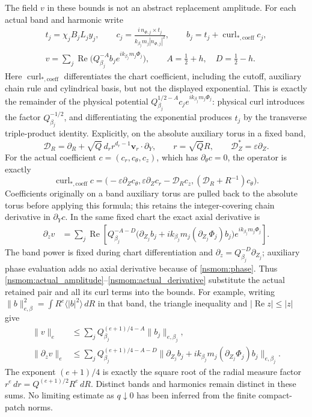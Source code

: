 The field $v$ in these bounds is not an abstract replacement amplitude.
For each actual band and harmonic write
\begin{gather}
 t_j=\chi_jB_jL_jy_j,\qquad
 c_j=\frac{i\,n_{\Phi,j}\times t_j}
                  {k_{\beta_j}m_j|n_{\Phi,j}|^2},\qquad
 b_j=t_j+\operatorname{curl}_{*,\mathrm{coeff}}c_j,\nonumber\\
 v=\sum_j\operatorname{Re}
       \bigl(Q_{\beta_j}^{-A}b_j e^{ik_{\beta_j}m_j\Phi_j}\bigr),
 \qquad A=\tfrac12+h,\quad D=\tfrac12-h.
 \label{nsmom:actual_amplitude}
\end{gather}
Here $\operatorname{curl}_{*,\mathrm{coeff}}$ differentiates the chart
coefficient, including the cutoff, auxiliary chain rule and cylindrical
basis, but not the displayed exponential. This is exactly the
remainder of the physical potential
$Q_{\beta_j}^{1/2-A}c_j e^{ik_{\beta_j}m_j\Phi_j}$: physical curl
introduces the factor $Q_{\beta_j}^{-1/2}$, and differentiating the
exponential produces $t_j$ by the transverse triple-product identity.
Explicitly, on the absolute auxiliary torus in a fixed band,
\[
 \mathscr D_R=\partial_R+
 \sqrt Q\,d_r r^{d_r-1}\mathbf v_r\cdot\partial_Y,
 \qquad r=\sqrt Q R,\qquad \mathscr D_Z^*=\varepsilon\partial_Z.
\]
For the actual coefficient $c=(c_r,c_\theta,c_z)$, which has
$\partial_\theta c=0$, the operator is exactly
\[
 \operatorname{curl}_{*,\mathrm{coeff}}c
 =\bigl(-\varepsilon\partial_Zc_\theta,
       \varepsilon\partial_Zc_r-\mathscr D_Rc_z,
       (\mathscr D_R+R^{-1})c_\theta\bigr).
\]
Coefficients originally on a band auxiliary torus are pulled back to
the absolute torus before applying this formula; this retains the
integer-covering chain derivative in $\partial_Yc$.
In the same fixed chart the exact axial derivative is
\begin{align}
 \partial_zv
 &=\sum_j\operatorname{Re}\left[
 Q_{\beta_j}^{-A-D}
 \bigl(\partial_{Z_j}b_j+
   ik_{\beta_j}m_j(\partial_{Z_j}\Phi_j)b_j\bigr)
 e^{ik_{\beta_j}m_j\Phi_j}\right].
 \label{nsmom:actual_derivative}
\end{align}
The band power is fixed during chart differentiation and
$\partial_z=Q_{\beta_j}^{-D}\partial_{Z_j}$; auxiliary phase evaluation
adds no axial derivative because of \eqref{nsmom:phase}. Thus
\eqref{nsmom:actual_amplitude}--\eqref{nsmom:actual_derivative} substitute
the actual retained pair and all its curl terms into the bounds.
For example, writing
$\|b\|_{e,\beta}^2=\int R^e\langle|b|^2\rangle\,dR$ in that band,
the triangle inequality and $|\operatorname{Re}z|\le|z|$ give
\begin{align}
 \|v\|_e
 &\le\sum_j Q_{\beta_j}^{(e+1)/4-A}\|b_j\|_{e,\beta_j},
 \label{nsmom:scale_bound}\\
 \|\partial_zv\|_e
 &\le\sum_j Q_{\beta_j}^{(e+1)/4-A-D}
 \|\partial_{Z_j}b_j+
 ik_{\beta_j}m_j(\partial_{Z_j}\Phi_j)b_j\|_{e,\beta_j}.
 \label{nsmom:scale_derivative_bound}
\end{align}
The exponent $(e+1)/4$ is exactly the square root of the radial measure
factor $r^e\,dr=Q^{(e+1)/2}R^e\,dR$. Distinct bands and harmonics
remain distinct in these sums. No limiting estimate as $q\downarrow0$
has been inferred from the finite compact-patch norms.

